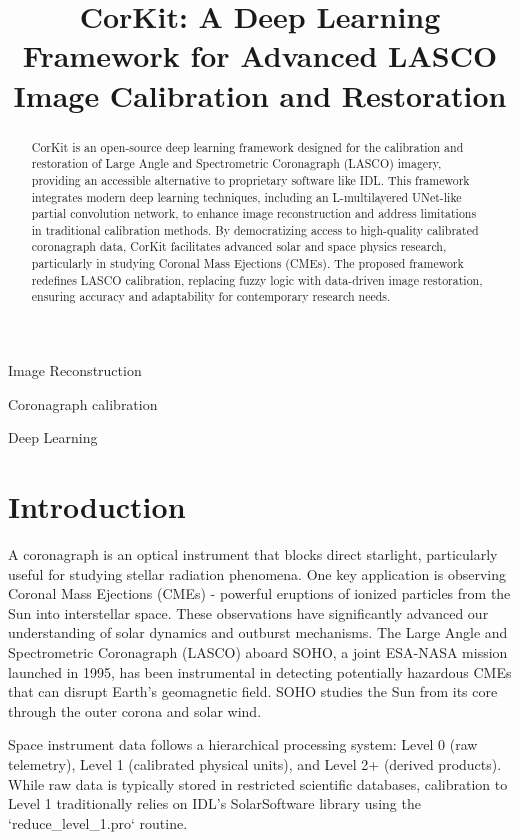 \documentclass[draft]{agujournal2019}
\begin{document}
\title{CorKit: A Deep Learning Framework for Advanced LASCO Image Calibration and Restoration}


\begin{keypoints}
\item Image Reconstruction
\item Coronagraph calibration
\item Deep Learning
\end{keypoints}

\begin{abstract}
    CorKit is an open-source deep learning framework designed for the calibration and restoration of Large Angle and Spectrometric Coronagraph (LASCO) imagery, providing an accessible alternative to proprietary software like IDL. This framework integrates modern deep learning techniques, including an L-multilayered UNet-like partial convolution network, to enhance image reconstruction and address limitations in traditional calibration methods. By democratizing access to high-quality calibrated coronagraph data, CorKit facilitates advanced solar and space physics research, particularly in studying Coronal Mass Ejections (CMEs). The proposed framework redefines LASCO calibration, replacing fuzzy logic with data-driven image restoration, ensuring accuracy and adaptability for contemporary research needs.
\end{abstract}

\section{Introduction}

A coronagraph is an optical instrument that blocks direct starlight, particularly useful for studying stellar radiation phenomena. One key application is observing Coronal Mass Ejections (CMEs) - powerful eruptions of ionized particles from the Sun into interstellar space. These observations have significantly advanced our understanding of solar dynamics and outburst mechanisms.
The Large Angle and Spectrometric Coronagraph (LASCO) aboard SOHO, a joint ESA-NASA mission launched in 1995, has been instrumental in detecting potentially hazardous CMEs that can disrupt Earth's geomagnetic field. SOHO studies the Sun from its core through the outer corona and solar wind.

Space instrument data follows a hierarchical processing system: Level 0 (raw telemetry), Level 1 (calibrated physical units), and Level 2+ (derived products). While raw data is typically stored in restricted scientific databases, calibration to Level 1 traditionally relies on IDL's SolarSoftware library using the `reduce\_level\_1.pro` routine.
\end{document}
